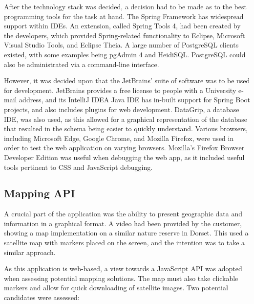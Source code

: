 After the technology stack was decided, a decision had to be made as to the best programming tools for the task at hand. The Spring Framework has widespread support within IDEs. An extension, called Spring Tools 4, had been created by the developers, which provided Spring-related functionality to Eclipse, Microsoft Visual Studio Tools, and Eclipse Theia. A large number of PostgreSQL clients existed, with some examples being pgAdmin 4 and HeidiSQL. PostgreSQL could also be administrated via a command-line interface.

However, it was decided upon that the JetBrains' suite of software was to be used for development. JetBrains provides a free license to people with a University e-mail address, and its IntelliJ IDEA Java IDE has in-built support for Spring Boot projects, and also includes plugins for web development. DataGrip, a database IDE, was also used, as this allowed for a graphical representation of the database that resulted in the schema being easier to quickly understand. Various browsers, including Microsoft Edge, Google Chrome, and Mozilla Firefox, were used in order to test the web application on varying browsers. Mozilla's Firefox Browser Developer Edition was useful when debugging the web app, as it included useful tools pertinent to CSS and JavaScript debugging.

\subsection{Mapping API}

A crucial part of the application was the ability to present geographic data and information in a graphical format. A video had been provided by the customer, showing a map implementation on a similar nature reserve in Dorset. This used a satellite map with markers placed on the screen, and the intention was to take a similar approach.

As this application is web-based, a view towards a JavaScript API was adopted when assessing potential mapping solutions. The map must also take clickable markers and allow for quick downloading of satellite images. Two potential candidates were assessed:

